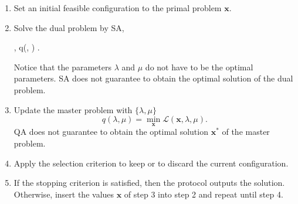 \begin{enumerate}
    \item Set an initial feasible configuration to the primal problem $\mathbf{x}$.
    \item Solve the dual problem by SA,
\begin{maxi!}[2]
	{\lambda, \mu}{q(\lambda, \mu)}{}{}{}
	.
\end{maxi!}
Notice that the parameters $\lambda$ and $\mu$ do not have to be the optimal parameters. SA does not guarantee to obtain the optimal solution of the dual problem.
    \item Update the master problem with $\{\lambda, \mu\}$ 
    \begin{equation}
        q(\lambda,\mu) = \min_{\mathbf{x}} \mathcal{L}(\mathbf{x}, \lambda, \mu).
    \end{equation}
     QA does not guarantee to obtain the optimal solution $\mathbf{x}^{*}$ of the master problem.
    \item Apply the selection criterion to keep or to discard the current configuration.
    \item If the stopping criterion is satisfied, then the protocol outputs the solution. Otherwise, insert the values $\mathbf{x}$ of step 3 into step 2 and repeat until step 4.
\end{enumerate}




